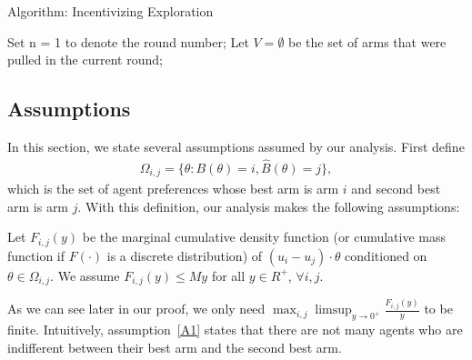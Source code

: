 \begin{algorithm}
\caption{Algorithm: Incentivizing Exploration}
\label{Alg1}
\begin{algorithmic}
\STATE Set n = 1 to denote the round number; Let $V=\emptyset$ be the set of arms that were pulled in the current round;
\ENDFOR

\end{algorithmic}
\end{algorithm}


\subsection{Assumptions}
In this section, we state several assumptions assumed by our analysis.  First define
\begin{align}
\Omega_{i,j}=\{\theta:B(\theta)=i, \hat{B}(\theta)=j\}, \nonumber 
\end{align}
which is the set of agent preferences whose best arm is arm $i$ and second best arm is arm $j$. With this definition, our analysis makes the following assumptions:

\begin{assumption} Let $F_{i,j}(y)$ be the marginal cumulative density function (or cumulative mass function if $F(\cdot)$ is a discrete distribution) of $(u_i-u_j)\cdot\theta$ conditioned on $\theta \in \Omega_{i,j}$. We assume $F_{i,j}(y)\leq My$ for all $y\in R^{+}$, $\forall i,j$. 
\label{A1}
\end{assumption}

As we can see later in our proof, we only need $\max_{i,j}\limsup_{y\rightarrow 0^{+}}\frac{F_{i,j}(y)}{y}$ to be finite. Intuitively, assumption~\ref{A1} states that there are not many agents who are indifferent between their best arm and the second best arm. 

